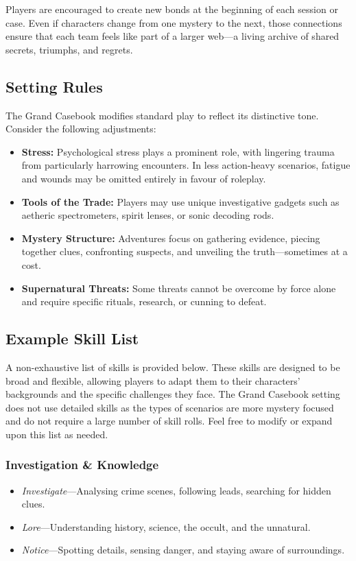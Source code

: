 Players are encouraged to create new bonds at the beginning of each session or case. Even if characters change from one mystery to the next, those connections ensure that each team feels like part of a larger web—a living archive of shared secrets, triumphs, and regrets.

\subsection{Setting Rules}

The Grand Casebook modifies standard play to reflect its distinctive tone. Consider the following adjustments:

\begin{itemize}\raggedright
    \item \textbf{Stress:} Psychological stress plays a prominent role, with lingering trauma from particularly harrowing encounters. In less action-heavy scenarios, fatigue and wounds may be omitted entirely in favour of roleplay.
    
    \item \textbf{Tools of the Trade:} Players may use unique investigative gadgets such as aetheric spectrometers, spirit lenses, or sonic decoding rods.
    
    \item \textbf{Mystery Structure:} Adventures focus on gathering evidence, piecing together clues, confronting suspects, and unveiling the truth—sometimes at a cost.
    
    \item \textbf{Supernatural Threats:} Some threats cannot be overcome by force alone and require specific rituals, research, or cunning to defeat.
\end{itemize}

\subsection{Example Skill List}

A non-exhaustive list of skills is provided below. These skills are designed to be broad and flexible, allowing players to adapt them to their characters' backgrounds and the specific challenges they face. The Grand Casebook setting does not use detailed skills as the types of scenarios are more mystery focused and do not require a large number of skill rolls. Feel free to modify or expand upon this list as needed.

\subsubsection*{Investigation \& Knowledge}  
\begin{itemize}\raggedright
    \item \emph{Investigate}---Analysing crime scenes, following leads, searching for hidden clues.
    \item \emph{Lore}---Understanding history, science, the occult, and the unnatural.
    \item \emph{Notice}---Spotting details, sensing danger, and staying aware of surroundings.
\end{itemize}


